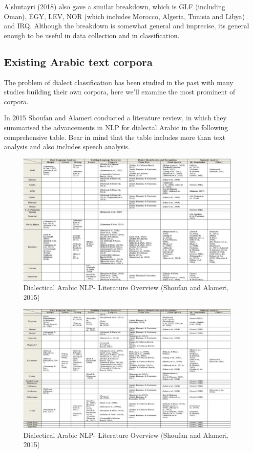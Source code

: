 \documentclass[12pt]{diazessay}
\begin{document}
        Alshutayri (2018) also gave a similar breakdown, which is GLF (including Oman), EGY, LEV, NOR (which includes Morocco, Algeria, Tunisia and Libya) and IRQ. Although the breakdown is somewhat general and imprecise, its general enough to be useful in data collection and in classification.
        
        
    \subsection{Existing Arabic text corpora}
    The problem of dialect classification has been studied in the past with many studies building their own corpora, here we'll examine the most prominent of corpora.
    
    In 2015 Shoufan and Alameri conducted a literature review, in which they summarised the advancements in NLP for dialectal Arabic in the following comprehensive table\cite{shoufan_alameri_2015_natural}. Bear in mind that the table includes more than text analysis and also includes speech analysis.
    
    \clearpage
    \begin{figure}[h]
        \hskip-3cm
        \includegraphics[scale=0.45]{Figures/past_word_1.png}
        \caption{Dialectical Arabic NLP- Literature Overview (Shoufan and Alameri, 2015)}
        \label{fig:cmp}
    \end{figure}
    
    \clearpage
    \begin{figure}[h]
        \hskip-3cm
        \includegraphics[scale=0.45]{Figures/past_work_2.png}
        \caption{Dialectical Arabic NLP- Literature Overview (Shoufan and Alameri, 2015)}
        \label{fig:cmp}
    \end{figure}
    \clearpage
    
\end{document}
